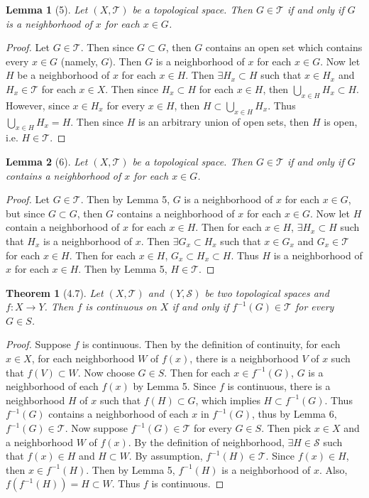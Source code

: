 \documentclass[12pt]{article}
\theoremstyle{plain}
\newtheorem*{theorem*}{Theorem}
\newtheorem*{lemma*}{Lemma}
\begin{document}
\begin{lemma*}[5]
    Let $(X, \mathcal{T})$ be a topological space.  Then $G \in \mathcal{T}$ if and only if $G$ is a neighborhood of $x$ for each $x \in G$.
\end{lemma*}
\begin{proof}
    Let $G\in\mathcal{T}$.  Then since $G \subset G$, then $G$ contains an open set which contains every $x \in G$ (namely, $G$).  Then $G$ is a neighborhood of $x$ for each $x \in G$.  Now let $H$ be a neighborhood of $x$ for each $x \in H$.  Then $\exists H_x \subset H$ such that $x \in H_x$ and $H_x \in \mathcal{T}$ for each $x \in X$.  Then since $H_x \subset H$ for each $x \in H$, then $\bigcup_{x\in H} H_x \subset H$.  However, since $x \in H_x$ for every $x \in H$, then $H \subset \bigcup_{x\in H} H_x$.  Thus $\bigcup_{x\in H} H_x = H$.  Then since $H$ is an arbitrary union of open sets, then $H$ is open, i.e. $H \in \mathcal{T}$.
\end{proof}
\begin{lemma*}[6]
    Let $(X, \mathcal{T})$ be a topological space.  Then $G \in \mathcal{T}$ if and only if $G$ contains a neighborhood of $x$ for each $x \in G$.
\end{lemma*}
\begin{proof}
    Let $G\in\mathcal{T}$.  Then by Lemma 5, $G$ is a neighborhood of $x$ for each $x \in G$, but since $G \subset G$, then $G$ contains a neighborhood of $x$ for each $x \in G$.  Now let $H$ contain a neighborhood of $x$ for each $x \in H$.  Then for each $x \in H$, $\exists H_x \subset H$ such that $H_x$ is a neighborhood of $x$.  Then $\exists G_x \subset H_x$ such that $x\in G_x$ and $G_x \in \mathcal{T}$ for each $x \in H$.  Then for each $x \in H$, $G_x \subset H_x \subset H$.  Thus $H$ is a neighborhood of $x$ for each $x \in H$.  Then by Lemma 5, $H \in \mathcal{T}$.
\end{proof}
\begin{theorem*}[4.7]
    Let $(X, \mathcal{T})$ and $(Y, \mathcal{S})$ be two topological spaces and $f: X \rightarrow Y$.  Then $f$ is continuous on $X$ if and only if $f^{-1}(G) \in \mathcal{T}$ for every $G \in S$.
\end{theorem*}
\begin{proof}
    Suppose $f$ is continuous.  Then by the definition of continuity, for each $x \in X$, for each neighborhood $W$ of $f(x)$, there is a neighborhood $V$ of $x$ such that $f(V) \subset W$.  Now choose $G \in S$.  Then for each $x \in f^{-1}(G)$, $G$ is a neighborhood of each $f(x)$ by Lemma 5.  Since $f$ is continuous, there is a neighborhood $H$ of $x$ such that $f(H) \subset G$, which implies $H \subset f^{-1}(G)$.  Thus $f^{-1}(G)$ contains a neighborhood of each $x$ in $f^{-1}(G)$, thus by Lemma 6, $f^{-1}(G) \in \mathcal{T}$.  Now suppose $f^{-1}(G) \in \mathcal{T}$ for every $G \in S$.  Then pick $x \in X$ and a neighborhood $W$ of $f(x)$.  By the definition of neighborhood, $\exists H \in \mathcal{S}$ such that $f(x) \in H$ and $H \subset W$.  By assumption, $f^{-1}(H) \in \mathcal{T}$.  Since $f(x) \in H$, then $x \in f^{-1}(H)$.  Then by Lemma 5, $f^{-1}(H)$ is a neighborhood of $x$.  Also, $f(f^{-1}(H)) = H \subset W$.  Thus $f$ is continuous.
\end{proof}
\end{document}
